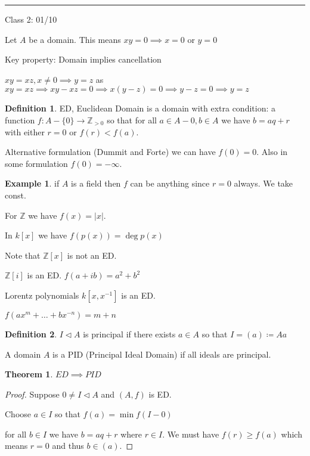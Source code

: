 \documentclass{article}
\theoremstyle{definition}
\newtheorem{example}{Example}
\newtheorem{definition}{Definition}
\newtheorem{theorem}{Theorem}
\begin{document}
\hrule
\hfil

Class 2: 01/10

Let \(A\) be a domain. This means \(xy=0\implies x=0 \text{ or } y=0\)

Key property: Domain implies cancellation

\(xy=xz,x\neq 0\implies y=z\) as \(xy=xz\implies xy-xz=0\implies x(y-z)=0\implies y-z=0\implies y=z\)

\begin{definition}
    ED, Euclidean Domain is a domain with extra condition: a function \(f:A-\{0\}\to\mathbb{Z}_{>0}\) so that for all \(a\in A-0,b\in A\) we have \(b=aq+r\) with either \(r=0\) or \(f(r)<f(a)\).
    
    Alternative formulation (Dummit and Forte) we can have \(f(0)=0\). Also in some formulation \(f(0)=-\infty\).  
\end{definition}

\begin{example}
    if \(A\) is a field then \(f\) can be anything since \(r=0\) always. We take const.

    For \(\mathbb{Z}\) we have \(f(x)=|x|\).
    
    In \(k[x]\) we have \(f(p(x))=\deg p(x)\)

    Note that \(\mathbb{Z}[x]\) is not an ED.

    \(\mathbb{Z}[i]\) is an ED. \(f(a+ib)=a^{2}+b^{2}\)
    
    Lorentz polynomials \(k[x,x ^{-1} ]\) is an ED.

    \(f(ax^m + \dots + bx^{-n} )=m+n\)
\end{example}

\begin{definition}  
    \(I\triangleleft A\) is principal if there exists \(a\in A\) so that \(I=(a)\coloneqq Aa\) 
\end{definition}    

A domain \(A\) is a PID (Principal Ideal Domain) if all ideals are principal.

\begin{theorem}
    \(ED\implies PID\) 
\end{theorem}

\begin{proof}
    Suppose \(0\neq I\triangleleft A\) and \((A,f)\) is ED.
    
    Choose \(a\in I\) so that \(f(a)=\min f(I-0)\) 

    for all \(b\in I\) we have \(b=aq+r\) where \(r\in I\). We must have \(f(r)\geq f(a)\) which means \(r=0\) and thus \(b\in(a)\).   

\end{proof}
\end{document}
